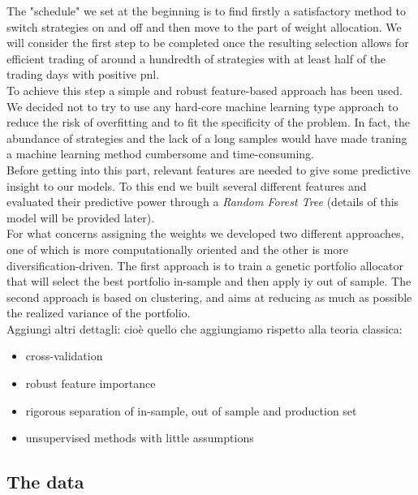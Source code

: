 \documentclass[12pt]{article} %
\numberwithin{equation}{subsection}
\begin{document}
The "schedule" we set at the beginning is to find firstly a satisfactory method to switch strategies on and off and then move to the part of weight allocation. We will consider the first step to be completed once the resulting selection allows for efficient trading of around a hundredth of strategies with at least half of the trading days with positive pnl.\\
To achieve this step a simple and robust feature-based approach has been used. We decided not to try to use any hard-core machine learning type approach to reduce the risk of overfitting and to fit the specificity of the problem. In fact, the abundance of strategies and the lack of a long samples would have made traning a machine learning method cumbersome and time-consuming.\\
Before getting into this part, relevant features are needed to give some predictive insight to our models. To this end we built several different features and evaluated their predictive power through a \textit{Random Forest Tree} (details of this model will be provided later).\\
For what concerns assigning the weights we developed two different approaches, one of which is more computationally oriented and the other is more diversification-driven. The first approach is to train a genetic portfolio allocator that will select the best portfolio in-sample and then apply iy out of sample. The second approach is based on clustering, and aims at reducing as much as possible the realized variance of the portfolio.\\

Aggiungi altri dettagli: cioè quello che aggiungiamo rispetto alla teoria classica:
\begin{itemize}
	\item cross-validation
	\item robust feature importance
	\item rigorous separation of in-sample, out of sample and production set
	\item unsupervised methods with little assumptions
\end{itemize}


\subsection{The data}
\end{document}
